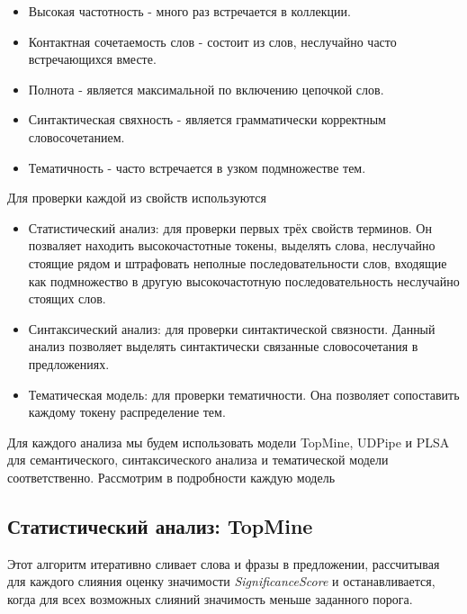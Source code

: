 \begin{itemize}
    \item Высокая частотность - много раз встречается в коллекции.
    \item Контактная сочетаемость слов - состоит из слов, неслучайно часто встречающихся вместе.
    \item Полнота - является максимальной по включению цепочкой слов.
    \item Синтактическая свяхность - является грамматически корректным словосочетанием.
    \item Тематичность - часто встречается в узком подмножестве тем.
\end{itemize}

Для проверки каждой из свойств используются

\begin{itemize}
    \item Статистический анализ: для проверки первых трёх свойств терминов. Он позваляет находить высокочастотные токены, выделять слова, неслучайно стоящие рядом и штрафовать неполные последовательности слов, входящие как подмножество в другую высокочастотную последовательность неслучайно стоящих слов.
    \item Синтаксический анализ: для проверки синтактической связности. Данный анализ позволяет выделять синтактически связанные словосочетания в предложениях.
    \item Тематическая модель: для проверки тематичности. Она позволяет сопоставить каждому токену распределение тем.
\end{itemize}

Для каждого анализа мы будем использовать модели TopMine, UDPipe и PLSA для семантического, синтаксического анализа и тематической модели соответственно. Рассмотрим в подробности каждую модель

\subsection*{Статистический анализ: TopMine}

Этот алгоритм итеративно сливает слова и фразы в предложении, рассчитывая для каждого слияния оценку значимости \textit{SignificanceScore} и останавливается, когда для всех возможных слияний значимость меньше заданного порога.

